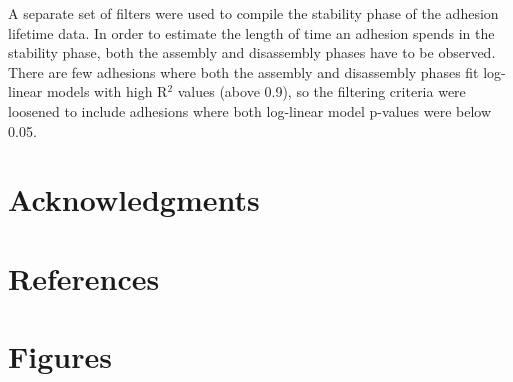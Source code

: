 \documentclass[10pt]{article}
\begin{document}
A separate set of filters were used to compile the stability phase of the
adhesion lifetime data. In order to estimate the length of time an adhesion
spends in the stability phase, both the assembly and disassembly phases have to
be observed. There are few adhesions where both the assembly and disassembly
phases fit log-linear models with high R$^2$ values (above 0.9), so the
filtering criteria were loosened to include adhesions where both log-linear
model p-values were below 0.05.

\section*{Acknowledgments}

\section*{References}


\section*{Figures}


\end{document}
